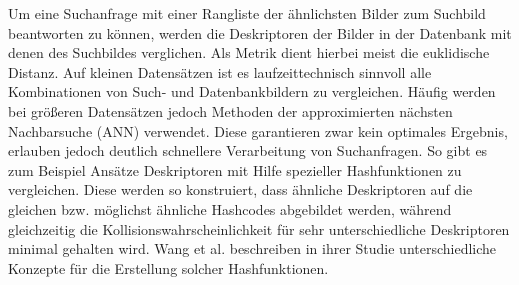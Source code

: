 Um eine Suchanfrage mit einer Rangliste der ähnlichsten Bilder zum Suchbild beantworten zu können, werden die Deskriptoren der Bilder in der Datenbank mit denen des Suchbildes verglichen. Als Metrik dient hierbei meist die euklidische Distanz. Auf kleinen Datensätzen ist es laufzeittechnisch sinnvoll alle Kombinationen von Such- und Datenbankbildern zu vergleichen. Häufig werden bei größeren Datensätzen jedoch Methoden der approximierten nächsten Nachbarsuche (ANN) verwendet. Diese garantieren zwar kein optimales Ergebnis, erlauben jedoch deutlich schnellere Verarbeitung von Suchanfragen. So gibt es zum Beispiel Ansätze Deskriptoren mit Hilfe spezieller Hashfunktionen zu vergleichen. Diese werden so konstruiert, dass ähnliche Deskriptoren auf die gleichen bzw. möglichst ähnliche Hashcodes abgebildet werden, während gleichzeitig die Kollisionswahrscheinlichkeit für sehr unterschiedliche Deskriptoren minimal gehalten wird. Wang et al. beschreiben in ihrer Studie \cite{simsearch} unterschiedliche Konzepte für die Erstellung solcher Hashfunktionen.








